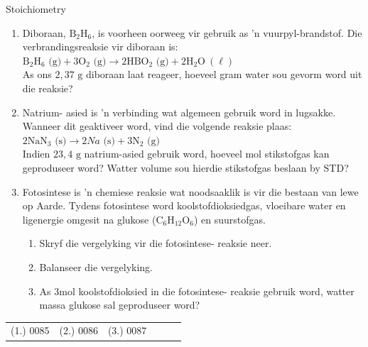     \noindent
            \begin{exercises}{  Stoichiometry
      }
            \nopagebreak \noindent
      \label{m38712*id285393}\begin{enumerate}[noitemsep, label=\textbf{\arabic*}. ] 
            \label{m38712*uid101}\item Diboraan, $\text{B}{}_{2}\text{H}{}_{6}$, is voorheen oorweeg vir gebruik as 'n vuurpyl-brandstof. Die verbrandingsreaksie vir diboraan is:\\
${\text{B}}_{2}{\text{H}}_{6} \text{ (g)} + 3{\text{O}}_{2} \text{ (g)} \to 2\text{H}\text{B}{\text{O}}_{2} \text{ (g)} + 2{\text{H}}_{2}\text{O} ~\left( \ell \right)$\\
As ons $2,37 \text{ g}$ diboraan laat reageer, hoeveel gram water sou gevorm word uit die reaksie?
\item Natrium- asied is 'n verbinding wat algemeen gebruik word in lugsakke. Wanneer dit geaktiveer word, vind die volgende reaksie plaas: \\
$2{\text{NaN}}_{3} \text{ (s)} \to 2Na \text{ (s)} + 3{\text{N}}_{2} \text{ (g)}$\\
Indien $23,4 \text{ g}$ natrium-asied gebruik word, hoeveel mol stikstofgas kan geproduseer word? Watter volume sou hierdie stikstofgas beslaan by STD?
\label{m38712*uid103}\item Fotosintese is 'n chemiese reaksie wat noodsaaklik is vir die bestaan ​​van lewe op
         Aarde. Tydens fotosintese word koolstofdioksiedgas, vloeibare water en ligenergie omgesit na glukose ($\text{C}{}_{6}\text{H}{}_{12}\text{O}{}_{6}$) en suurstofgas.
\label{m38712*id285674}\begin{enumerate}[noitemsep, label=\textbf{\alph*}. ] 
            \label{m38712*uid104}\item Skryf die vergelyking vir die fotosintese- reaksie neer.
\label{m38712*uid105}\item Balanseer die vergelyking.
\label{m38712*uid106}\item As $3 \text{mol}$ koolstofdioksied in die fotosintese- reaksie gebruik word, watter massa glukose sal geproduseer word?
\end{enumerate}
                \end{enumerate}
\practiceinfo
\par 
 \par \begin{tabular}[h]{cccccc}
 (1.) 0085  &  (2.) 0086  &  (3.) 0087  & \end{tabular}
\end{exercises}

